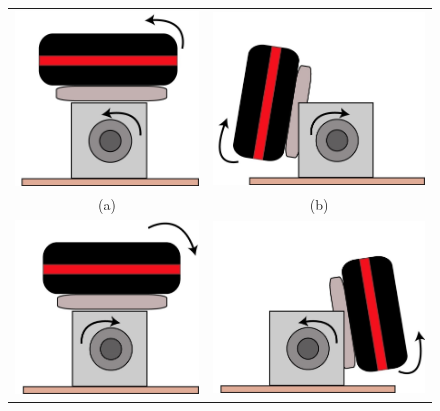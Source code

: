 \begin{figure}%
     \centering
     \begin{tabular}{cc}
        \includegraphics[width=.40\textwidth]{images/lidar_rot_tras2.jpg}&
        \includegraphics[width=.40\textwidth]{images/lidar_rot_tras3.jpg}\\
        (a)&(b)\\
        \includegraphics[width=.40\textwidth]{images/lidar_rot_tras.jpg}&
        \includegraphics[width=.40\textwidth]{images/lidar_rot_tras1.jpg}\\

\end{tabular}
\end{figure}
